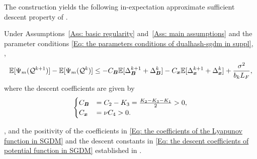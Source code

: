 The construction yields the following in-expectation approximate sufficient
descent property of .
\begin{lemma}
    \label{Lemma: approximate sufficient descent property in SGDM} Under Assumptions~\ref{Ass: basic regularity} and~\ref{Ass: main assumptions} and the parameter conditions \eqref{Eq: the parameters conditions of dualhash-sgdm in suppl}, ,
    \begin{align}
        \label{Eq: the descent property of Lyapunov func in SGDM}\EE [\Psi_m(\mathcal{Q}^{k+1})] - \EE[\Psi_m(\mathcal{Q}^{k})] \leq -C_{\bB}\EE[\Delta_{\bB}^{k+1}+ \Delta_{\bB}^{k}] -C_{\bx}\EE [\Delta_{\bm{x}}^{k+1}+ \Delta_{\bm{x}}^{k}] + \frac{\sigma^{2}}{b_{k}L_{F}},
    \end{align}
    where the descent coefficients are given by
    \begin{align}
        \label{Eq: the descent coefficients of potential function in SGDM}\begin{cases}C_{\bB}&= C_{2}- K_{3}= \frac{K_2 - K_3 -K_1}{2}>0, \\ C_{\bx}&= \nu C_{4}>0.\end{cases}
    \end{align}
\end{lemma}
, and the positivity of the coefficients in
\eqref{Eq: the coefficients of the Lyapunov function in SGDM} and the descent
constants in \eqref{Eq: the descent coefficients of potential function in SGDM}
 established in .

